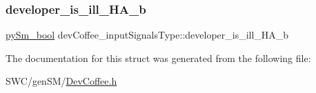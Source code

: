 \mbox{\label{structdevCoffee__inputSignalsType_ab9063470d37a4246a62bc5437fc8c283}} 
\subsubsection{\texorpdfstring{developer\+\_\+is\+\_\+ill\+\_\+\+H\+A\+\_\+b}{developer\_is\_ill\_HA\_b}}
{\footnotesize\ttfamily \hyperlink{PySm__types_8h_a368133d64634d66410f3fe1343de6ba3}{py\+Sm\+\_\+bool} dev\+Coffee\+\_\+input\+Signals\+Type\+::developer\+\_\+is\+\_\+ill\+\_\+\+H\+A\+\_\+b}



The documentation for this struct was generated from the following file\+:\begin{DoxyCompactItemize}
\item 
S\+W\+C/gen\+S\+M/\hyperlink{DevCoffee_8h}{Dev\+Coffee.\+h}\end{DoxyCompactItemize}
